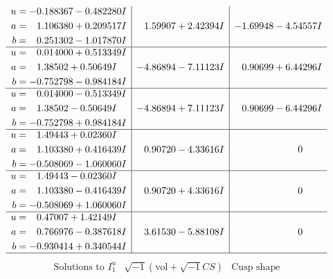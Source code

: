 \documentclass[1p]{elsarticle_modified}
\theoremstyle{definition}
\newcommand{\I}{\sqrt{-1}}
\begin{document}
$$\begin{array}{c|c|c}
\begin{aligned}
u &= -0.188367 - 0.482280 I \\
a &= \phantom{-}1.106380 + 0.209517 I \\
b &= \phantom{-}0.251302 - 1.017870 I\end{aligned}
 & \phantom{-}1.59907 + 2.42394 I & -1.69948 - 4.54557 I \\ \hline\begin{aligned}
u &= \phantom{-}0.014000 + 0.513349 I \\
a &= \phantom{-}1.38502 + 0.50649 I \\
b &= -0.752798 - 0.984184 I\end{aligned}
 & -4.86894 - 7.11123 I & \phantom{-}0.90699 + 6.44296 I \\ \hline\begin{aligned}
u &= \phantom{-}0.014000 - 0.513349 I \\
a &= \phantom{-}1.38502 - 0.50649 I \\
b &= -0.752798 + 0.984184 I\end{aligned}
 & -4.86894 + 7.11123 I & \phantom{-}0.90699 - 6.44296 I \\ \hline\begin{aligned}
u &= \phantom{-}1.49443 + 0.02360 I \\
a &= \phantom{-}1.103380 + 0.416439 I \\
b &= -0.508069 - 1.060060 I\end{aligned}
 & \phantom{-}0.90720 - 4.33616 I & \phantom{-0.000000 } 0 \\ \hline\begin{aligned}
u &= \phantom{-}1.49443 - 0.02360 I \\
a &= \phantom{-}1.103380 - 0.416439 I \\
b &= -0.508069 + 1.060060 I\end{aligned}
 & \phantom{-}0.90720 + 4.33616 I & \phantom{-0.000000 } 0 \\ \hline\begin{aligned}
u &= \phantom{-}0.47007 + 1.42149 I \\
a &= \phantom{-}0.766976 - 0.387618 I \\
b &= -0.930414 + 0.340544 I\end{aligned}
 & \phantom{-}3.61530 - 5.88108 I & \phantom{-0.000000 } 0\\
 \hline 
 \end{array}$$\newpage$$\begin{array}{c|c|c}  
\text{Solutions to }I^u_{1}& \I (\text{vol} + \sqrt{-1}CS) & \text{Cusp shape}\\

\end{array}$$
\end{document}
